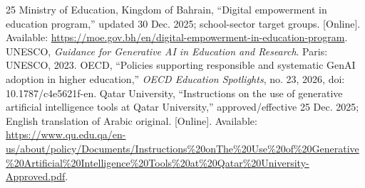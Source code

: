 \documentclass[conference,letterpaper]{IEEEtran}
\begin{document}
\begin{thebibliography}{25}
 Ministry of Education, Kingdom of Bahrain, ``Digital empowerment in education program,'' updated 30 Dec. 2025; school-sector target groups. [Online]. Available: \url{https://moe.gov.bh/en/digital-empowerment-in-education-program}.
 UNESCO, \emph{Guidance for Generative AI in Education and Research}. Paris: UNESCO, 2023.
 OECD, ``Policies supporting responsible and systematic GenAI adoption in higher education,'' \emph{OECD Education Spotlights}, no. 23, 2026, doi: 10.1787/c4e5621f-en.
 Qatar University, ``Instructions on the use of generative artificial intelligence tools at Qatar University,'' approved/effective 25 Dec. 2025; English translation of Arabic original. [Online]. Available: \url{https://www.qu.edu.qa/en-us/about/policy/Documents/Instructions%20onThe%20Use%20of%20Generative%20Artificial%20Intelligence%20Tools%20at%20Qatar%20University-Approved.pdf}.
\end{thebibliography}
\end{document}
